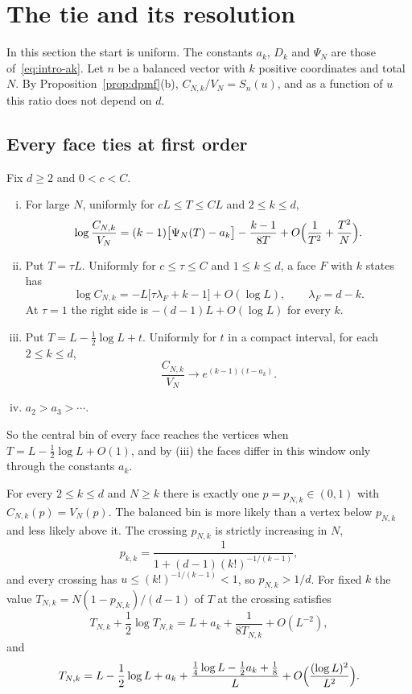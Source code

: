 \section{The tie and its resolution}\label{sec:simplex-thresholds}

In this section the start is uniform. The constants $a_k$, $D_k$ and $\Psi_N$
are those of~\eqref{eq:intro-ak}. Let $n$ be a balanced vector with $k$ positive
coordinates and total $N$. By Proposition~\ref{prop:dpmf}(b),
$C_{N,k}/V_N=S_n(u)$, and as a function of $u$ this ratio does not depend
on $d$.

\subsection{Every face ties at first order}\label{sec:tie}

\begin{theorem}\label{thm:simplex-window}
Fix $d\ge2$ and $0<c<C$.
\begin{enumerate}[(i)]
\item For large $N$, uniformly for $cL\le T\le CL$ and $2\le k\le d$,
\[
\log\frac{C_{N,k}}{V_N}=(k-1)\bigl[\Psi_N(T)-a_k\bigr]-\frac{k-1}{8T}
+O\Bigl(\frac1{T^2}+\frac{T^2}N\Bigr).
\]
\item Put $T=\tau L$. Uniformly for $c\le\tau\le C$ and $1\le k\le d$, a face
$F$ with $k$ states has
\[
\log C_{N,k}=-L\bigl[\tau\lambda_F+k-1\bigr]+O(\log L),\qquad\lambda_F=d-k .
\]
At $\tau=1$ the right side is $-(d-1)L+O(\log L)$ for every $k$.
\item Put $T=L-\frac12\log L+t$. Uniformly for $t$ in a compact interval, for
each $2\le k\le d$,
\begin{equation}\label{eq:simplex-window}
\frac{C_{N,k}}{V_N}\longrightarrow e^{(k-1)(t-a_k)} .
\end{equation}
\item $a_2>a_3>\cdots$.
\end{enumerate}
\end{theorem}

So the central bin of every face reaches the vertices when
$T=L-\frac12\log L+O(1)$, and by (iii) the faces differ in this window only
through the constants $a_k$.

\begin{theorem}\label{thm:simplex-crossing}
For every $2\le k\le d$ and $N\ge k$ there is exactly one $p=p_{N,k}\in(0,1)$
with $C_{N,k}(p)=V_N(p)$. The balanced bin is more likely than a vertex below
$p_{N,k}$ and less likely above it. The crossing $p_{N,k}$ is strictly
increasing in $N$,
\[
p_{k,k}=\frac1{1+(d-1)(k!)^{-1/(k-1)}},
\]
and every crossing has $u\le(k!)^{-1/(k-1)}<1$, so $p_{N,k}>1/d$. For fixed $k$
the value $T_{N,k}=N(1-p_{N,k})/(d-1)$ of $T$ at the crossing satisfies
\[
T_{N,k}+\frac12\log T_{N,k}=L+a_k+\frac1{8T_{N,k}}+O(L^{-2}),
\]
and
\begin{equation}\label{eq:simplex-root-expansion}
T_{N,k}=L-\frac12\log L+a_k
+\frac{\frac14\log L-\frac12a_k+\frac18}{L}
+O\Bigl(\frac{(\log L)^2}{L^2}\Bigr).
\end{equation}
\end{theorem}


